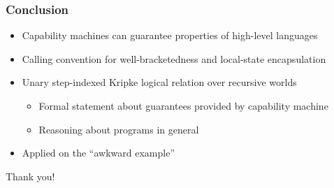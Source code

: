 \documentclass{beamer}
\begin{document}

\begin{frame}
  \frametitle{Conclusion}
  \begin{itemize}
  \item Capability machines can guarantee properties of high-level languages
  \item Calling convention for well-bracketedness and local-state encapsulation
  \item Unary step-indexed Kripke logical relation over recursive worlds
    \begin{itemize}
    \item Formal statement about guarantees provided by capability machine
    \item Reasoning about programs in general
    \end{itemize}
  \item Applied on the ``awkward example''
  \end{itemize}
\end{frame}

\begin{frame}
  \centering
  Thank you!
\end{frame}
\end{document}

